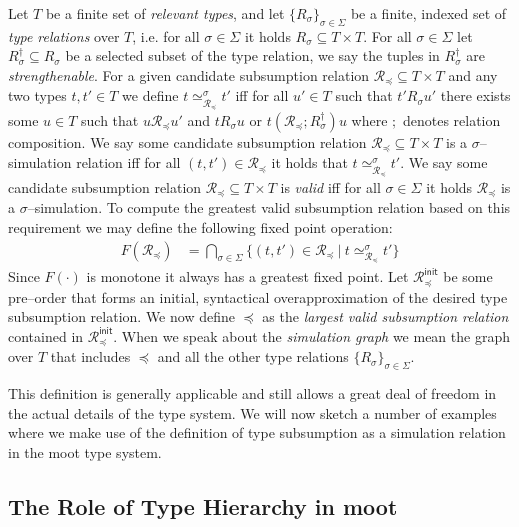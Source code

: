 \documentclass{sigplanconf}
\newcommand{\concept}[1]{\emph{#1}}
\newcommand{\ms}[1]{\mathsf{#1}}
\newcommand{\mc}[1]{\mathcal{#1}}
\newcommand{\simulates}{\simeq}
\begin{document}
\begin{definition}
Let $T$ be a finite set of \concept{relevant
  types}, and let $\{ R_\sigma \}_{\sigma \in \Sigma}$ be a finite,
indexed set of \concept{type relations} over $T$, i.e. for all $\sigma
\in \Sigma$ it holds $R_\sigma \subseteq T \times T$. For all $\sigma
\in \Sigma$ let $R^\dagger_\sigma \subseteq R_\sigma$ be a selected
subset of the type relation, we say the tuples in $R^\dagger_\sigma$
are \concept{strengthenable}.
For a given candidate subsumption relation $\mc{R}_\preceq \subseteq T
\times T$ and any two types $t, t' \in T$ we define $t
\simulates_{\mc{R}_\preceq}^\sigma t'$ iff for all $u' \in T$ such that $t'
R_\sigma u'$ there exists some $u \in T$ such that $u \mc{R}_\preceq u'$
and $t R_\sigma u$ or $t (\mc{R}_\preceq ; R_\sigma^\dagger) u$ where $;$
denotes relation composition.
We say some candidate subsumption relation $\mc{R}_\preceq \subseteq T
\times T$ is a $\sigma$--simulation relation iff for all $(t, t') \in
\mc{R}_\preceq$ it holds that $t \simulates_{\mc{R}_\preceq}^\sigma t'$.
We say some candidate subsumption relation $\mc{R}_\preceq \subseteq T
\times T$ is \concept{valid} iff for all $\sigma \in \Sigma$ it holds
$\mc{R}_\preceq$ is a $\sigma$--simulation.
To compute the greatest valid subsumption relation based on this
requirement we may define the following fixed point operation:
\begin{align*}
F( \mc{R}_\preceq ) &= \bigcap_{\sigma \in \Sigma} \{ (t, t') \in
\mc{R}_\preceq\ |\ t \simulates_{\mc{R}_\preceq}^{\sigma} t' \}
\end{align*}
Since $F(\cdot)$ is monotone it always has a greatest fixed point. Let
$\mc{R}^\ms{init}_\preceq$ be some pre--order that forms an initial,
syntactical overapproximation of the desired type subsumption
relation. We now define $\preceq$ as the \emph{largest valid
  subsumption relation} contained in $\mc{R}^\ms{init}_\preceq$.
When we speak about the \concept{simulation graph} we mean the graph
over $T$ that includes $\preceq$ and all the other type relations $\{
R_\sigma \}_{\sigma \in \Sigma}$.
\end{definition}

This definition is generally applicable and still allows a great deal
of freedom in the actual details of the type system. We will now
sketch a number of examples where we make use of the definition of
type subsumption as a simulation relation in the {\sc moot} type
system.

\subsection{The Role of Type Hierarchy in {\sc moot}}
\end{document}
